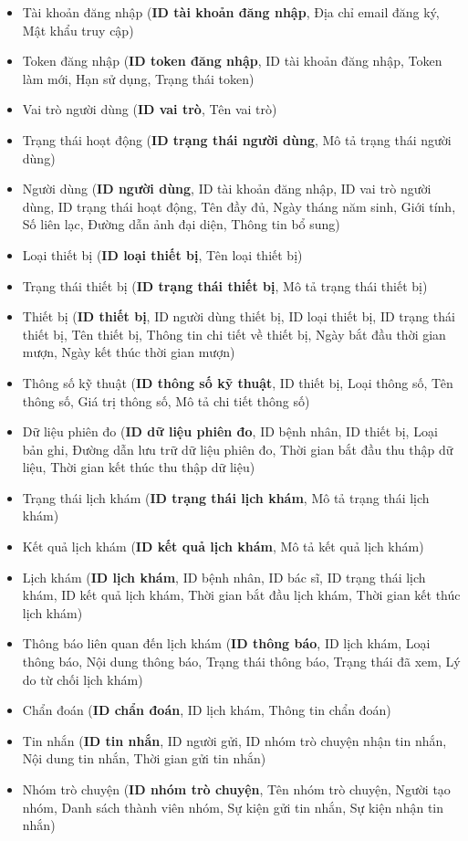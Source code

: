 \begin{itemize}
	\item Tài khoản đăng nhập (\textbf{ID tài khoản đăng nhập}, Địa chỉ email đăng ký, Mật khẩu truy cập)
	\item Token đăng nhập (\textbf{ID token đăng nhập}, ID tài khoản đăng nhập, Token làm mới, Hạn sử dụng, Trạng thái token)
	\item Vai trò người dùng (\textbf{ID vai trò}, Tên vai trò)
	\item Trạng thái hoạt động (\textbf{ID trạng thái người dùng}, Mô tả trạng thái người dùng)
	\item Người dùng (\textbf{ID người dùng}, ID tài khoản đăng nhập, ID vai trò người dùng, ID trạng thái hoạt động, Tên đầy đủ, Ngày tháng năm sinh, Giới tính, Số liên lạc, Đường dẫn ảnh đại diện, Thông tin bổ sung)
	\item Loại thiết bị (\textbf{ID loại thiết bị}, Tên loại thiết bị)
	\item Trạng thái thiết bị (\textbf{ID trạng thái thiết bị}, Mô tả trạng thái thiết bị)
	\item Thiết bị (\textbf{ID thiết bị}, ID người dùng thiết bị, ID loại thiết bị, ID trạng thái thiết bị, Tên thiết bị, Thông tin chi tiết về thiết bị, Ngày bắt đầu thời gian mượn, Ngày kết thúc thời gian mượn)
	\item Thông số kỹ thuật (\textbf{ID thông số kỹ thuật}, ID thiết bị, Loại thông số, Tên thông số, Giá trị thông số, Mô tả chi tiết thông số)
	\item Dữ liệu phiên đo (\textbf{ID dữ liệu phiên đo}, ID bệnh nhân, ID thiết bị, Loại bản ghi, Đường dẫn lưu trữ dữ liệu phiên đo, Thời gian bắt đầu thu thập dữ liệu, Thời gian kết thúc thu thập dữ liệu)
	\item Trạng thái lịch khám (\textbf{ID trạng thái lịch khám}, Mô tả trạng thái lịch khám)
	\item Kết quả lịch khám (\textbf{ID kết quả lịch khám}, Mô tả kết quả lịch khám)
	\item Lịch khám (\textbf{ID lịch khám}, ID bệnh nhân, ID bác sĩ, ID trạng thái lịch khám, ID kết quả lịch khám, Thời gian bắt đầu lịch khám, Thời gian kết thúc lịch khám)
	\item Thông báo liên quan đến lịch khám (\textbf{ID thông báo}, ID lịch khám, Loại thông báo, Nội dung thông báo, Trạng thái thông báo, Trạng thái đã xem, Lý do từ chối lịch khám)
	\item Chẩn đoán (\textbf{ID chẩn đoán}, ID lịch khám, Thông tin chẩn đoán)
	\item Tin nhắn (\textbf{ID tin nhắn}, ID người gửi, ID nhóm trò chuyện nhận tin nhắn, Nội dung tin nhắn, Thời gian gửi tin nhắn)
	\item Nhóm trò chuyện (\textbf{ID nhóm trò chuyện}, Tên nhóm trò chuyện, Người tạo nhóm, Danh sách thành viên nhóm, Sự kiện gửi tin nhắn, Sự kiện nhận tin nhắn)

\end{itemize}
